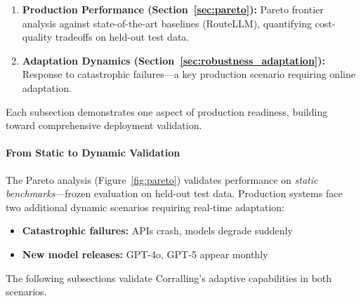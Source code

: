 \begin{enumerate}
    \item \textbf{Production Performance (Section~\ref{sec:pareto}):} Pareto frontier analysis against state-of-the-art baselines (RouteLLM), quantifying cost-quality tradeoffs on held-out test data.
    
    \item \textbf{Adaptation Dynamics (Section~\ref{sec:robustness_adaptation}):} Response to catastrophic failures---a key production scenario requiring online adaptation.
\end{enumerate}

Each subsection demonstrates one aspect of production readiness, building toward comprehensive deployment validation.



\paragraph{From Static to Dynamic Validation}
The Pareto analysis (Figure~\ref{fig:pareto}) validates performance on \emph{static benchmarks}—frozen evaluation on held-out test data. Production systems face two additional dynamic scenarios requiring real-time adaptation:

\begin{itemize}
    \item \textbf{Catastrophic failures:} APIs crash, models degrade suddenly
    \item \textbf{New model releases:} GPT-4o, GPT-5 appear monthly
\end{itemize}

The following subsections validate Corralling's adaptive capabilities in both scenarios.



